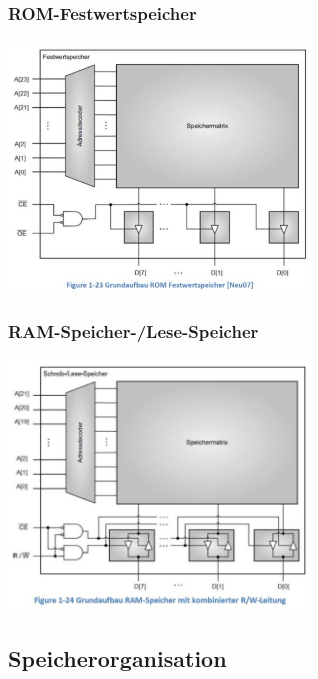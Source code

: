 \vspace{-1cm} 
\begin{multicols}{2}
    \subsubsection{ROM-Festwertspeicher}
    \includegraphics[width=8cm]{images/ROM}
    
    \subsubsection{RAM-Speicher-/Lese-Speicher}
    \includegraphics[width=8cm]{images/RAM}
\end{multicols}
    
\vspace{-1cm} 
\subsection{Speicherorganisation}
    
